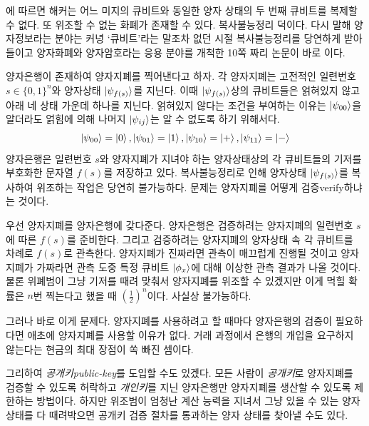 \documentclass[a4paper,chapter,atbegshi]{oblivoir}
\begin{document}
에 따르면 해커는 어느 미지의 큐비트와 동일한 양자 상태의
두 번째 큐비트를 복제할 수 없다. 또 위조할 수 없는 화폐가 존재할 수 있다.
복사불능정리 덕이다. 다시 말해 양자정보라는 분야는 커녕 `큐비트'라는 말조차
없던 시절 복사불능정리를 당연하게 받아들이고 양자화폐와 양자암호라는 응용
분야를 개척한 10쪽 짜리 논문이 바로 이다.

양자은행이 존재하여 양자지폐를 찍어낸다고 하자. 각 양자지폐는 고전적인 
일련번호 $s\in\{0,1\}^n$와 양자상태 $\ket{\psi_{f(s)}}$를 지닌다. 이때
$\ket{\psi_{f(s)}}$상의 큐비트들은 얽혀있지 않고 아래 네 상태 가운데
하나를 지닌다. 얽혀있지 않다는 조건을 부여하는 이유는 $\ket{\psi_{00}}$을 
알더라도 얽힘에 의해 나머지 $\ket{\psi_{ij}}$는 알 수 없도록 하기 위해서다.
\[
  \ket{\psi_{00}}=\ket0,\ket{\psi_{01}}=\ket1,\ket{\psi_{10}}=\ket+,
  \ket{\psi_{11}}=\ket-
\]
양자은행은 일련번호 $s$와 양자지폐가 지녀야 하는 양자상태상의 각 큐비트들의
기저를 부호화한 문자열 $f(s)$를 저장하고 있다. 복사불능정리로 인해
양자상태 $\ket{\psi_{f(s)}}$를 복사하여 위조하는 작업은 당연히 불가능하다. 
문제는 양자지폐를 어떻게 검증{\tiny verify}하냐는 것이다.

우선 양자지폐를 양자은행에 갖다준다. 양자은행은 검증하려는 양자지폐의 일련번호
$s$에 따른 $f(s)$를 준비한다. 그리고 검증하려는 양자지폐의 양자상태 속 각
큐비트를 차례로 $f(s)$로 관측한다. 양자지폐가 진짜라면 관측이 매끄럽게 진행될
것이고 양자지폐가 가짜라면 관측 도중 특정 큐비트 $\ket{\phi_x}$에 대해 이상한
관측 결과가 나올 것이다. 물론 위폐범이 그냥 기저를 때려 맞춰서 양자지폐를
위조할 수 있겠지만 이게 먹힐 확률은 $n$번 찍는다고 했을 때 
$\left(\frac{1}{2}\right)^n$이다. 사실상 불가능하다.

그러나 바로 이게 문제다. 양자지폐를 사용하려고 할 때마다 양자은행의 검증이
필요하다면 애초에 양자지폐를 사용할 이유가 없다. 거래 과정에서 은행의 개입을
요구하지 않는다는 현금의 최대 장점이 쏙 빠진 셈이다. 

그리하여 \emph{공개키\tiny public-key}를 도입할 수도 있겠다. 모든 사람이
\emph{공개키}로 양자지폐를 검증할 수 있도록 허락하고 \emph{개인키}를 지닌
양자은행만 양자지폐를 생산할 수 있도록 제한하는 방법이다. 
하지만 위조범이 엄청난 계산 능력을 지녀서 그냥 있을 수 있는 양자 상태를
다 때려박으면 공개키 검증 절차를 통과하는 양자 상태를 찾아낼 수도 있다. 
\end{document}
